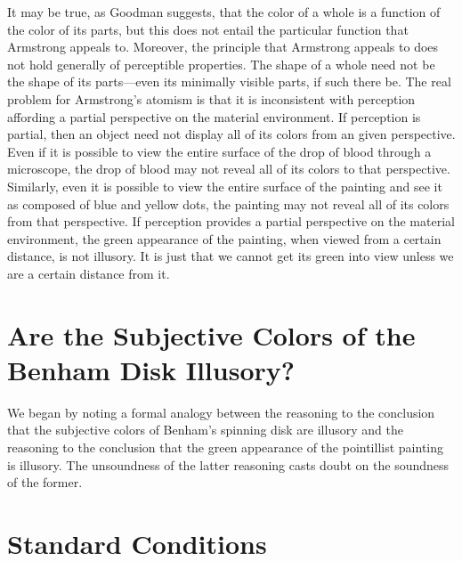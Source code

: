 \documentclass[12pt]{article}
\begin{document}
It may be true, as Goodman suggests, that the color of a whole is a function of the color of its parts, but this does not entail the particular function that Armstrong appeals to. Moreover, the principle that Armstrong appeals to does not hold generally of perceptible properties. The shape of a whole need not be the shape of its parts---even its minimally visible parts, if such there be. The real problem for Armstrong's atomism is that it is inconsistent with perception affording a partial perspective on the material environment. If perception is partial, then an object need not display all of its colors from an given perspective. Even if it is possible to view the entire surface of the drop of blood through a microscope, the drop of blood may not reveal all of its colors to that perspective. Similarly, even it is possible to view the entire surface of the painting and see it as composed of blue and yellow dots, the painting may not reveal all of its colors from that perspective. If perception provides a partial perspective on the material environment, the green appearance of the painting, when viewed from a certain distance, is not illusory. It is just that we cannot get its green into view unless we are a certain distance from it.



\section{Are the Subjective Colors of the Benham Disk Illusory?}\label{sec:are_the_subjective_colors_of_the_benham_disk_illusory_} %

We began by noting a formal analogy between the reasoning to the conclusion that the subjective colors of Benham's spinning disk are illusory and the reasoning to the conclusion that the green appearance of the pointillist painting is illusory. The unsoundness of the latter reasoning casts doubt on the soundness of the former.


\section{Standard Conditions}\label{sec:standard_conditions} %
\end{document}
